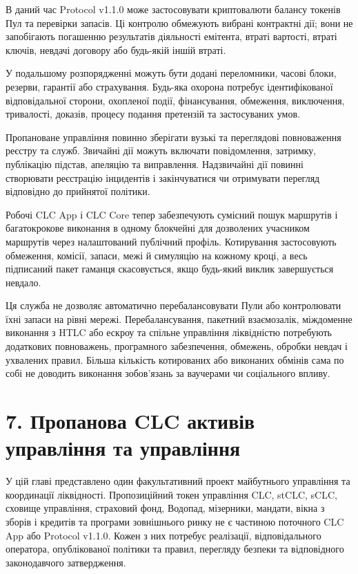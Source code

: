 \documentclass[11pt]{article}
\begin{document}
В даний час Protocol v1.1.0 може застосовувати криптовалюти балансу токенів Пул та перевірки запасів. Ці контролю обмежують вибрані контрактні дії; вони не запобігають погашенню результатів діяльності емітента, втраті вартості, втраті ключів, невдачі договору або будь-якій іншій втраті.

У подальшому розпорядженні можуть бути додані переломники, часові блоки, резерви, гарантії або страхування. Будь-яка охорона потребує ідентифікованої відповідальної сторони, охопленої події, фінансування, обмеження, виключення, тривалості, доказів, процесу подання претензій та застосуваних умов.

Пропановане управління повинно зберігати вузькі та переглядові повноваження реєстру та служб. Звичайні дії можуть включати повідомлення, затримку, публікацію підстав, апеляцію та виправлення. Надзвичайні дії повинні створювати реєстрацію інцидентів і закінчуватися чи отримувати перегляд відповідно до прийнятої політики.

Робочі CLC App і CLC Core тепер забезпечують сумісний пошук маршрутів і багатокрокове виконання в одному блокчейні для дозволених учасником маршрутів через налаштований публічний профіль. Котирування застосовують обмеження, комісії, запаси, межі й симуляцію на кожному кроці, а весь підписаний пакет гаманця скасовується, якщо будь-який виклик завершується невдало.

Ця служба не дозволяє автоматично перебалансовувати Пули або контролювати їхні запаси на рівні мережі. Перебалансування, пакетний взаємозалік, міждоменне виконання з HTLC або ескроу та спільне управління ліквідністю потребують додаткових повноважень, програмного забезпечення, обмежень, обробки невдач і ухвалених правил. Більша кількість котированих або виконаних обмінів сама по собі не доводить виконання зобов'язань за ваучерами чи соціального впливу.


\section*{7. Пропанова CLC активів управління та управління}

У цій главі представлено один факультативний проект майбутнього управління та координації ліквідності. Пропозиційний токен управління CLC, stCLC, sCLC, сховище управління, страховий фонд, Водопад, мізерники, мандати, вікна з зборів і кредитів та програми зовнішнього ринку не є частиною поточного CLC App або Protocol v1.1.0. Кожен з них потребує реалізації, відповідального оператора, опублікованої політики та правил, перегляду безпеки та відповідного законодавчого затвердження.
\end{document}
